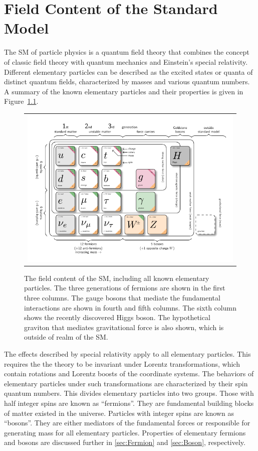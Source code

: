 \chapter{Field Content of the Standard Model}
\label{chap:Field}

The \ac{SM} of particle physics is a quantum field theory that combines the concept of classic field theory with quantum mechanics and Einstein's special relativity. Different elementary particles can be described as the excited states or quanta of distinct quantum fields, characterized by masses and various quantum numbers. A summary of the known elementary particles and their properties is given in Figure~\ref{fig:Field}.

\begin{figure}[tbh!]
 \begin{center}
 \begin{tabular}{c}
 \includegraphics[width=\textwidth]{figures/Part1/Field/SM}
 \end{tabular}
 \caption{The field content of the \ac{SM}, including all known elementary particles. The three generations of fermions are shown in the first three columns. The gauge bosons that mediate the fundamental interactions are shown in fourth and fifth columns. The sixth column shows the recently discovered Higgs boson. The hypothetical graviton that mediates gravitational force is also shown, which is outside of realm of the \ac{SM}.~\cite{tikz:SM}}
 \label{fig:Field}
 \end{center}
\end{figure}

The effects described by special relativity apply to all elementary particles. This requires the the theory to be invariant under Lorentz transformations, which contain rotations and Lorentz boosts of the coordinate systems. The behaviors of elementary particles under such transformations are characterized by their spin quantum numbers. This divides elementary particles into two groups. Those with half integer spins are known as ``fermions''. They are fundamental building blocks of matter existed in the universe. Particles with integer spins are known as ``bosons''. They are either mediators of the fundamental forces or responsible for generating mass for all elementary particles. Properties of elementary fermions and bosons are discussed further in \ref{sec:Fermion} and \autoref{sec:Boson}, respectively. 

